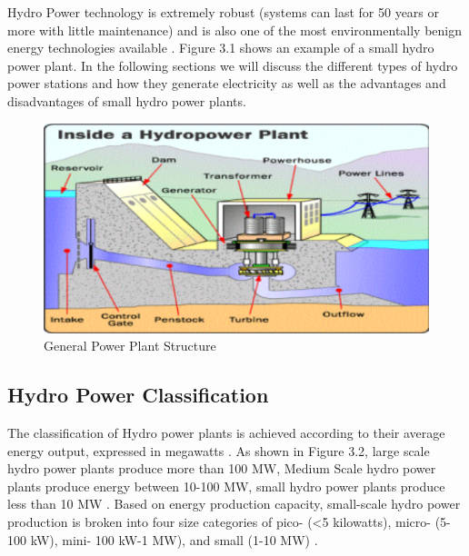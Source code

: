 Hydro Power technology is extremely robust (systems can last for 50 years or more with little maintenance) and is also one of the most environmentally benign energy technologies available \cite{paish2002small}. Figure 3.1 shows an example of a small hydro power plant. In the following sections we will discuss the different types of hydro power stations and how they generate electricity as well as the advantages and disadvantages of small hydro power plants.
\begin{figure}[H]
\centering
\includegraphics[scale=0.7]{Images/GeneralPowerPlant.png}
\caption[General Power Plant Structure]{General Power Plant Structure \cite{HydroPP}}
\end{figure}
\subsection{Hydro Power Classification}
The classification of Hydro power plants is achieved according to their average energy output, expressed in megawatts \cite{HydroPP}. As shown in Figure 3.2, large scale hydro power plants produce more than 100 MW, Medium Scale hydro power plants produce energy between 10-100 MW, small hydro power plants produce less than 10 MW \cite{HydroPP,SEIT2017}. Based on energy production capacity, small-scale hydro power production is broken into four size categories of pico- (<5 kilowatts), micro- (5-100 kW), mini- 100 kW-1 MW), and small (1-10 MW) \cite{HydroPP}.

